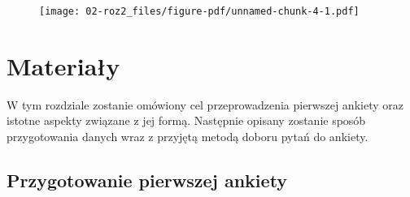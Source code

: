\documentclass{amuthesis}
\begin{document}
\begin{figure}[t]

{\centering \texttt{[image: 02-roz2\_files/figure-pdf/unnamed-chunk-4-1.pdf]}

}

\end{figure}

\begin{Shaded}
\begin{Highlighting}[]
\CommentTok{\# }
\end{Highlighting}
\end{Shaded}


\hypertarget{sec-materialy}{%
\chapter{Materiały}\label{sec-materialy}}

W tym rozdziale zostanie omówiony cel przeprowadzenia pierwszej ankiety
oraz istotne aspekty związane z jej formą. Następnie opisany zostanie
sposób przygotowania danych wraz z przyjętą metodą doboru pytań do
ankiety.

\hypertarget{sec-przygotowanie1}{%
\section{Przygotowanie pierwszej ankiety}\label{sec-przygotowanie1}}
\end{document}
